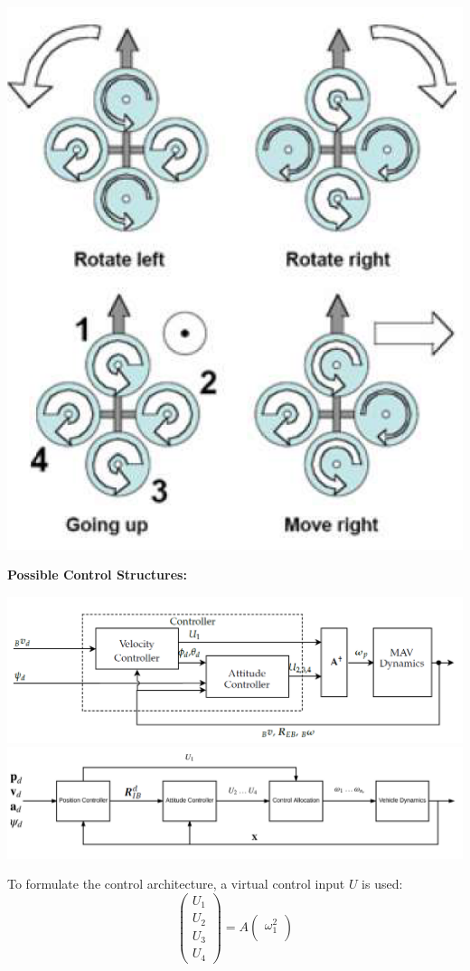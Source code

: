 \documentclass[a4paper, 8pt]{extarticle}
\begin{document}
\begin{multicols*}{3}
\begin{center}
\includegraphics[width=0.6\linewidth]{images/RC_MovingDirections.PNG}\\
\end{center}
\textbf{Possible Control Structures:}
\begin{center}
\includegraphics[width=1\linewidth]{images/RC_Control_Structure1.PNG}\\
    \includegraphics[width=1\linewidth]{images/RC_Control_Structure2.PNG}
\end{center}
To formulate the control architecture, a virtual control input $U$ is used:
$$ \begin{pmatrix}
U_1 \\U_2 \\U_3 \\U_4 
\end{pmatrix}=A\begin{pmatrix}
\omega_{1}^2 \\

\end{pmatrix}$$
\end{multicols*}
\end{document}
